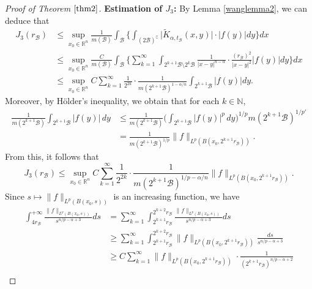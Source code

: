 \documentclass[10pt, reqno]{amsart}
\theoremstyle{definition}
\theoremstyle{remark}
\numberwithin{equation}{section}
\begin{document}
\begin{proof}[Proof of Theorem $\ref{thm2}$]
\textbf{Estimation of $J_3$:} By Lemma \ref{wanglemma2}, we can deduce that
\begin{equation*}
\begin{split}
J_3(r_{\mathcal{B}})&\leq \sup_{x_0\in\mathbb R^n}\frac{1}{m(\mathcal{B})}
\int_{\mathcal{B}}\bigg\{\int_{(2\mathcal{B})^{\complement}}\big|\widetilde{K}_{\alpha,t_{\mathcal{B}}}(x,y)\big|\cdot\big|f(y)\big|dy\bigg\}dx\\
&\leq\sup_{x_0\in\mathbb R^n}\frac{C}{m(\mathcal{B})}
\int_{\mathcal{B}}\bigg\{\sum_{k=1}^{\infty}\int_{2^{k+1}\mathcal{B}\setminus 2^k \mathcal{B}}
\frac{1}{|x-y|^{n-\alpha}}\cdot\frac{(r_{\mathcal{B}})^2}{|x-y|^{2}}\big|f(y)\big|dy\bigg\}dx\\
&\leq \sup_{x_0\in\mathbb R^n}C\sum_{k=1}^{\infty}\frac{1}{2^{2k}}\cdot\frac{1}{m(2^{k+1}\mathcal{B})^{1-\alpha/n}}
\int_{2^{k+1}\mathcal{B}}\big|f(y)\big|dy.
\end{split}
\end{equation*}
Moreover, by H\"{o}lder's inequality, we obtain that for each $k\in \mathbb{N}$,
\begin{equation*}
\begin{split}
\frac{1}{m(2^{k+1}\mathcal{B})}\int_{2^{k+1}\mathcal{B}}|f(y)|\,dy
&\leq\frac{1}{m(2^{k+1}\mathcal{B})}\bigg(\int_{2^{k+1}\mathcal{B}}|f(y)|^p\,dy\bigg)^{1/p}m(2^{k+1}\mathcal{B})^{1/{p'}}\\
&=\frac{1}{m(2^{k+1}\mathcal{B})^{1/p}}\big\|f\big\|_{L^p(B(x_0,2^{k+1}r_{\mathcal{B}}))}.
\end{split}
\end{equation*}
From this, it follows that
\begin{equation*}
J_3(r_{\mathcal{B}})\leq\sup_{x_0\in\mathbb R^n}C\sum_{k=1}^{\infty}\frac{1}{2^{2k}}\cdot\frac{1}{m(2^{k+1}\mathcal{B})^{1/p-\alpha/n}}
\big\|f\big\|_{L^p(B(x_0,2^{k+1}r_{\mathcal{B}}))}.
\end{equation*}
Since $s\mapsto\|f\|_{L^p(B(x_0,s))}$ is an increasing function, we have
\begin{equation}\label{wang6}
\begin{split}
\int_{4r_{\mathcal{B}}}^{+\infty}\frac{\|f\|_{L^p(B(x_0,s))}}{s^{n/p-\alpha+3}}ds
&=\sum_{k=1}^{\infty}\int_{2^{k+1}r_{\mathcal{B}}}^{2^{k+2}r_{\mathcal{B}}}\frac{\|f\|_{L^p(B(x_0,s))}}{s^{n/p-\alpha+3}}ds\\
&\geq\sum_{k=1}^{\infty}\int_{2^{k+1}r_{\mathcal{B}}}^{2^{k+2}r_{\mathcal{B}}}
\big\|f\big\|_{L^p(B(x_0,2^{k+1}r_{\mathcal{B}}))}\frac{ds}{s^{n/p-\alpha+3}}\\
&\geq C\sum_{k=1}^{\infty}\big\|f\big\|_{L^p(B(x_0,2^{k+1}r_{\mathcal{B}}))}\cdot\frac{1}{(2^{k+1}r_{\mathcal{B}})^{n/p-\alpha+2}}\\

\end{split}
\end{equation}
\end{proof}
\end{document}
